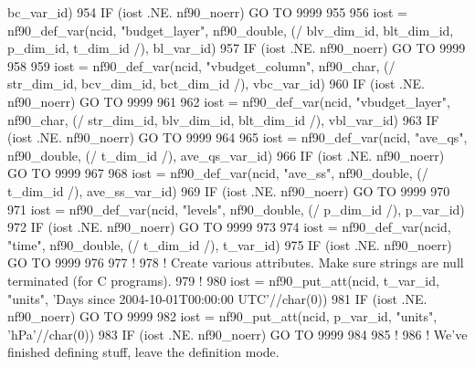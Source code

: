 \begin{DoxyCode}
      bc\_var\_id)
954     \textcolor{keywordflow}{IF} (iost .NE. nf90\_noerr) \textcolor{keywordflow}{GO TO} 9999
955 
956     iost    = nf90\_def\_var(ncid, \textcolor{stringliteral}{"budget\_layer"}, nf90\_double, (/ blv\_dim\_id, blt\_dim\_id, p\_dim\_id, t\_dim\_id
       /), bl\_var\_id)
957     \textcolor{keywordflow}{IF} (iost .NE. nf90\_noerr) \textcolor{keywordflow}{GO TO} 9999
958 
959     iost    = nf90\_def\_var(ncid, \textcolor{stringliteral}{"vbudget\_column"}, nf90\_char, (/ str\_dim\_id, bcv\_dim\_id, bct\_dim\_id /), 
      vbc\_var\_id)
960     \textcolor{keywordflow}{IF} (iost .NE. nf90\_noerr) \textcolor{keywordflow}{GO TO} 9999
961 
962     iost    = nf90\_def\_var(ncid, \textcolor{stringliteral}{"vbudget\_layer"}, nf90\_char, (/ str\_dim\_id, blv\_dim\_id, blt\_dim\_id /), 
      vbl\_var\_id)
963     \textcolor{keywordflow}{IF} (iost .NE. nf90\_noerr) \textcolor{keywordflow}{GO TO} 9999
964 
965     iost    = nf90\_def\_var(ncid, \textcolor{stringliteral}{"ave\_qs"}, nf90\_double, (/ t\_dim\_id /), ave\_qs\_var\_id)
966     \textcolor{keywordflow}{IF} (iost .NE. nf90\_noerr) \textcolor{keywordflow}{GO TO} 9999
967 
968     iost    = nf90\_def\_var(ncid, \textcolor{stringliteral}{"ave\_ss"}, nf90\_double, (/ t\_dim\_id /), ave\_ss\_var\_id)
969     \textcolor{keywordflow}{IF} (iost .NE. nf90\_noerr) \textcolor{keywordflow}{GO TO} 9999
970 
971     iost    = nf90\_def\_var(ncid, \textcolor{stringliteral}{"levels"}, nf90\_double, (/ p\_dim\_id /), p\_var\_id)
972     \textcolor{keywordflow}{IF} (iost .NE. nf90\_noerr) \textcolor{keywordflow}{GO TO} 9999
973 
974     iost    = nf90\_def\_var(ncid, \textcolor{stringliteral}{"time"}, nf90\_double, (/ t\_dim\_id /), t\_var\_id)
975     \textcolor{keywordflow}{IF} (iost .NE. nf90\_noerr) \textcolor{keywordflow}{GO TO} 9999
976 
977     \textcolor{comment}{!}
978     \textcolor{comment}{! Create various attributes. Make sure strings are null terminated (for C programs).}
979     \textcolor{comment}{!}
980     iost    = nf90\_put\_att(ncid, t\_var\_id, \textcolor{stringliteral}{"units"}, \textcolor{stringliteral}{'Days since 2004-10-01T00:00:00 UTC'}//char(0))
981     \textcolor{keywordflow}{IF} (iost .NE. nf90\_noerr) \textcolor{keywordflow}{GO TO} 9999
982     iost    = nf90\_put\_att(ncid, p\_var\_id, \textcolor{stringliteral}{"units"}, \textcolor{stringliteral}{'hPa'}//char(0))
983     \textcolor{keywordflow}{IF} (iost .NE. nf90\_noerr) \textcolor{keywordflow}{GO TO} 9999
984 
985     \textcolor{comment}{!}
986     \textcolor{comment}{! We've finished defining stuff, leave the definition mode.}

\end{DoxyCode}
